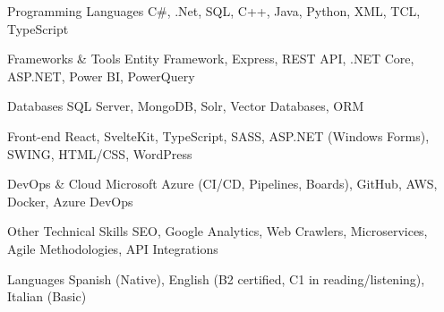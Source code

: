 

\begin{cvskills}
    \cvskill
    {Programming Languages} %
    {C\#, .Net, SQL, C++, Java, Python, XML, TCL, TypeScript} %

    \cvskill
    {Frameworks \& Tools} %
    {Entity Framework, Express, REST API, .NET Core, ASP.NET, Power BI, PowerQuery} %

    \cvskill
    {Databases} %
    {SQL Server, MongoDB, Solr, Vector Databases, ORM} %

    \cvskill
    {Front-end} %
    {React, SvelteKit, TypeScript, SASS, ASP.NET (Windows Forms), SWING, HTML/CSS, WordPress} %

    \cvskill
    {DevOps \& Cloud} %
    {Microsoft Azure (CI/CD, Pipelines, Boards), GitHub, AWS, Docker, Azure DevOps} %

    \cvskill
    {Other Technical Skills} %
    {SEO, Google Analytics, Web Crawlers, Microservices, Agile Methodologies, API Integrations} %

    \cvskill
    {Languages} %
    {Spanish (Native), English (B2 certified, C1 in reading/listening), Italian (Basic)} %

\end{cvskills}
